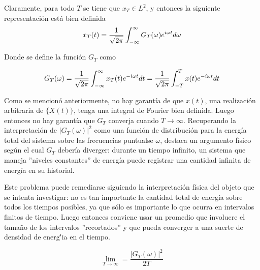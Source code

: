 Claramente, para todo $T$ se tiene que $x_T \in L^2$, y entonces la siguiente 
representaci\'on est\'a bien definida
\begin{equation}
x_T (t) = \frac{1}{\sqrt{2 \pi}} \int_{-\infty}^{\infty} G_T(\omega) e^{i \omega t} d\omega
\end{equation}

Donde se define la funci\'on $G_T$ como

\begin{equation}
G_T (\omega) = \frac{1}{\sqrt{2 \pi}} \int_{-\infty}^{\infty} x_T(t) e^{-i \omega t} dt
= \frac{1}{\sqrt{2 \pi}} \int_{-T}^{T} x(t) e^{-i \omega t} dt
\end{equation}

Como se mencion\'o anteriormente, no hay garant\'ia de que $x(t)$, una realizaci\'on arbitraria de
$\{X(t)\}$, tenga una integral de Fourier bien definida. Luego entonces no hay garant\'ia que 
$G_T$ converja cuando $T\rightarrow \infty$. Recuperando la interpretaci\'on de 
$\left| G_T(\omega) \right|^{2}$ como una funci\'on de distribuci\'on para la energ\'ia total del sistema 
sobre las frecuencias
puntualse $\omega$, destaca un argumento f\'isico seg\'un el cual $G_T$ {deber\'ia} diverger:
durante un tiempo infinito, un sistema que maneja ''niveles constantes'' de 
energ\'ia puede registrar una cantidad infinita de energ\'ia en su historial. 

Este problema puede remediarse 
siguiendo la interpretaci\'on f\'isica del objeto que se intenta investigar:
no es tan importante la
cantidad total de energ\'ia 
sobre todos los tiempos posibles, ya que s\'olo es importante lo que ocurra en intervalos finitos
de tiempo.
Luego entonces conviene usar un promedio que 
involucre el tama\~no de los intervalos ''recortados'' y que pueda converger a una suerte de 
densidad de energ\''ia en el tiempo.

\begin{equation}
\lim_{T\rightarrow{\infty}} = \frac{ \left| G_T(\omega) \right|^{2}}{2 T}
\label{yacasi}
\end{equation}


